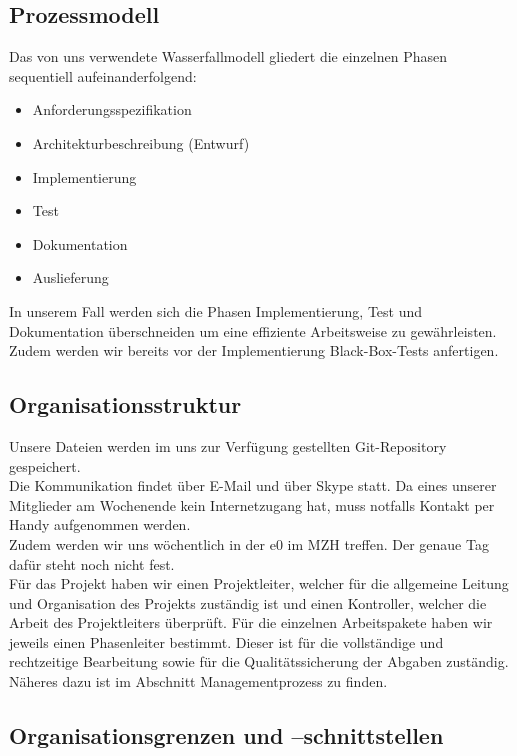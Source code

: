 \documentclass[fontsize=12pt,paper=a4,twoside]{scrartcl}
\begin{document}
\subsection{Prozessmodell}
\label{sec:prozessmodell}

Das von uns verwendete Wasserfallmodell gliedert die einzelnen Phasen sequentiell aufeinanderfolgend:\\
\begin{itemize}
\item Anforderungsspezifikation
\item Architekturbeschreibung (Entwurf)
\item Implementierung
\item Test
\item Dokumentation
\item Auslieferung
\end{itemize}
In unserem Fall werden sich die Phasen Implementierung, Test und Dokumentation überschneiden um eine effiziente Arbeitsweise zu gewährleisten. Zudem werden wir bereits vor der Implementierung Black-Box-Tests anfertigen.

\subsection{Organisationsstruktur}

Unsere Dateien werden im uns zur Verfügung gestellten Git-Repository gespeichert.\\
Die Kommunikation findet über E-Mail und über Skype statt. Da eines unserer Mitglieder am Wochenende kein Internetzugang hat, muss notfalls Kontakt per Handy aufgenommen werden. \\ 
Zudem werden wir uns wöchentlich in der e0 im MZH treffen. Der genaue Tag dafür steht noch nicht fest.\\ 
Für das Projekt haben wir einen Projektleiter, welcher für die allgemeine Leitung und Organisation des Projekts zuständig ist und einen Kontroller, welcher die Arbeit des Projektleiters überprüft. Für die einzelnen Arbeitspakete haben wir jeweils einen Phasenleiter bestimmt. Dieser ist für die vollständige und rechtzeitige Bearbeitung sowie für die Qualitätssicherung der Abgaben zuständig. Näheres dazu ist im Abschnitt Managementprozess zu finden.

\newpage
\subsection{Organisationsgrenzen und --schnittstellen}
\end{document}
